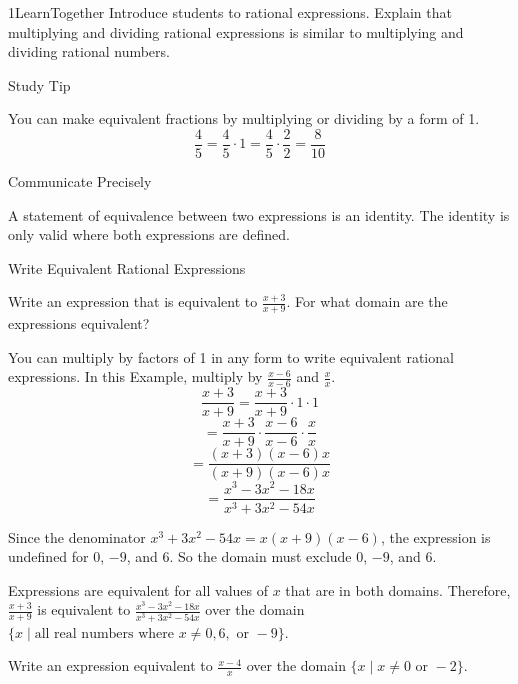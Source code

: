 \documentclass{article}
\newenvironment{concept-box}{}{}        %
\newenvironment{example}[1]{}{}         %
\newenvironment{tryit}[1]{}{}           %
\newenvironment{te-addendum}[2]{}{}     %
\newcommand{\answer}[1]{}               %
\begin{document}
\begin{te-addendum}{1}{LearnTogether}
Introduce students to rational expressions. Explain that multiplying and dividing rational expressions is similar to multiplying and dividing rational numbers.
\end{te-addendum}

\begin{concept-box}
Study Tip

You can make equivalent fractions by multiplying or dividing by a form of 1.
\[
\frac45=\frac45\cdot1=\frac45\cdot\frac22=\frac{8}{10}
\]
\end{concept-box}

\begin{concept-box}
Communicate Precisely

A statement of equivalence between two expressions is an identity. The identity is only valid where both expressions are defined.
\end{concept-box}

\begin{example}{1}
Write Equivalent Rational Expressions

Write an expression that is equivalent to $\frac{x+3}{x+9}$. For what domain are the expressions equivalent?

You can multiply by factors of 1 in any form to write equivalent rational expressions. In this Example, multiply by $\frac{x-6}{x-6}$ and $\frac{x}{x}$.
\[
\frac{x+3}{x+9}
=
\frac{x+3}{x+9}\cdot1\cdot1
\]
\[
=
\frac{x+3}{x+9}\cdot\frac{x-6}{x-6}\cdot\frac{x}{x}
\]
\[
=
\frac{(x+3)(x-6)x}{(x+9)(x-6)x}
\]
\[
=
\frac{x^3-3x^2-18x}{x^3+3x^2-54x}
\]

Since the denominator $x^3+3x^2-54x=x(x+9)(x-6)$, the expression is undefined for $0$, $-9$, and $6$. So the domain must exclude $0$, $-9$, and $6$.

Expressions are equivalent for all values of $x$ that are in both domains. Therefore, $\frac{x+3}{x+9}$ is equivalent to $\frac{x^3-3x^2-18x}{x^3+3x^2-54x}$ over the domain $\{x\mid \text{all real numbers where }x\neq0,6,\text{ or }-9\}$.

\answer{$\frac{x^3-3x^2-18x}{x^3+3x^2-54x}$ over the domain $\{x\mid x\neq0,6,-9\}$.}
\end{example}

\begin{tryit}{1}
Write an expression equivalent to $\frac{x-4}{x}$ over the domain $\{x\mid x\neq0\text{ or }-2\}$.

\answer{$\frac{x^2-2x-8}{x^2+2x}$}
\end{tryit}
\end{document}
